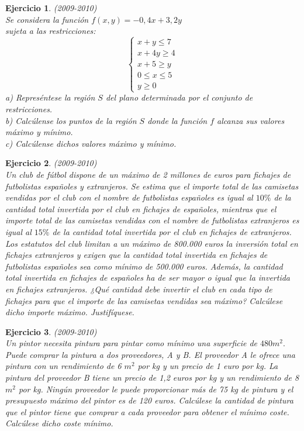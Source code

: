 \documentclass[12pt, a4paper]{amsart}
\newtheorem{ejer}{Ejercicio}
\begin{document}
\begin{ejer}\em (2009-2010)\\
Se considera la función $f(x,y)=-0,4x+3,2y$\\
sujeta a las restricciones: \[\left \{ \begin{matrix}
x+y\leq 7
\\ x+4y\geq 4
\\ x+5\geq y
\\0\leq x\leq 5
\\y\geq 0
\end{matrix}\right.\]
a) Represéntese la región $S$ del plano determinada por el conjunto de restricciones.\\
b) Calcúlense los puntos de la región $S$ donde la función $f$ alcanza sus valores máximo y mínimo.\\
c) Calcúlense dichos valores máximo y mínimo.
\end{ejer}

\begin{ejer}\em  (2009-2010)\\
Un club de fútbol dispone de un máximo de 2 millones de euros para fichajes de futbolistas españoles y extranjeros. Se estima que el importe total de las camisetas vendidas por el club con el nombre de futbolistas españoles es igual al $10\%$ de la cantidad total invertida por el club en fichajes de españoles, mientras que el importe total de las camisetas vendidas con el nombre de futbolistas extranjeros es igual al $15\%$ de la cantidad total invertida por el club en fichajes de extranjeros. Los estatutos del club limitan a un máximo de 800.000 euros la inversión total en fichajes extranjeros y exigen que la cantidad total invertida en fichajes de futbolistas españoles sea como mínimo de 500.000 euros. Además, la cantidad total invertida en fichajes de españoles ha de ser mayor o igual que la invertida en fichajes extranjeros. ¿Qué cantidad debe invertir el club en cada tipo de fichajes para que el importe de las camisetas vendidas sea máximo? Calcúlese dicho importe máximo. Justifíquese.
\end{ejer}

\begin{ejer}\em  (2009-2010)\\
Un pintor necesita pintura para pintar como mínimo una superficie de $480 m^2.$ Puede comprar la pintura a dos proveedores, A y B. El proveedor A le ofrece una pintura con un rendimiento de 6 $m^2$ por kg y un precio de 1 euro por kg. La pintura del proveedor B tiene un precio de 1,2 euros por kg y un rendimiento de 8 $m^2$ por kg. Ningún proveedor le puede proporcionar más de 75 kg de pintura y el presupuesto máximo del pintor es de 120 euros. Calcúlese la cantidad de pintura que el pintor tiene que comprar a cada proveedor para obtener el mínimo coste. Calcúlese dicho coste mínimo. 
\end{ejer}
\end{document}
